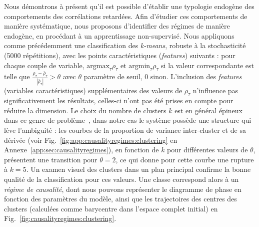{Nous démontrons à présent qu'il est possible d'établir une typologie endogène des comportements des corrélations retardées. Afin d'étudier ces comportements de manière systématique, nous proposons d'identifier des régimes de manière endogène, en procédant à un apprentissage non-supervisé. Nous appliquons comme précédemment une classification des \emph{k-means}, robuste à la stochasticité (5000 répétitions), avec les points caractéristiques (\emph{features}) suivants : pour chaque couple de variable, $\textrm{argmax}_{\tau} \rho_{\tau}$ et $\textrm{argmin}_{\tau} \rho_{\tau}$ si la valeur correspondante est telle que $\frac{\rho_{\tau}-\bar{\rho}_{\tau}}{\left|\bar{\rho}_{\tau}\right|} > \theta$ avec $\theta$ paramètre de seuil, 0 sinon. L'inclusion des \emph{features} (variables caractéristiques) supplémentaires des valeurs de $\rho_{\tau}$ n'influence pas significativement les résultats, celles-ci n'ont pas été prises en compte pour réduire la dimension. Le choix du nombre de clusters $k$ est en général épineux dans ce genre de problème~\cite{hamerly2003learning}, dans notre cas le système possède une structure qui lève l'ambiguité : les courbes de la proportion de variance inter-cluster et de sa dérivée (voir  Fig.~\ref{fig:app:causalityregimes:clustering} en Annexe~\ref{app:sec:causalityregimes}), en fonction de $k$ pour différentes valeurs de $\theta$, présentent une transition pour $\theta = 2$, ce qui donne pour cette courbe une rupture à $k=5$. Un examen visuel des clusters dans un plan principal confirme la bonne qualité de la classification pour ces valeurs. Une classe correspond alors à un \emph{régime de causalité}, dont nous pouvons représenter le diagramme de phase en fonction des paramètres du modèle, ainsi que les trajectoires des centres des clusters (calculées comme barycentre dans l'espace complet initial) en Fig.~\ref{fig:causalityregimes:clustering}.
}




